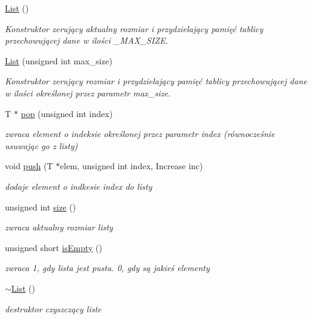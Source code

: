 \begin{DoxyCompactItemize}
\item 
\hypertarget{class_array_implementation_1_1_list_a751192da0de1a1e4095a259f24ba4bb8}{\hyperlink{class_array_implementation_1_1_list_a751192da0de1a1e4095a259f24ba4bb8}{List} ()}\label{class_array_implementation_1_1_list_a751192da0de1a1e4095a259f24ba4bb8}

\begin{DoxyCompactList}\small\item\em Konstruktor zerujący aktualny rozmiar i przydzielający pamięć tablicy przechowującej dane w ilości \-\_\-\-M\-A\-X\-\_\-\-S\-I\-Z\-E. \end{DoxyCompactList}\item 
\hyperlink{class_array_implementation_1_1_list_a8e7dfb9fc4fb0fb71d9bbf23973f5699}{List} (unsigned int max\-\_\-size)
\begin{DoxyCompactList}\small\item\em Konstruktor zerujący rozmiar i przydzielający pamięć tablicy przechowującej dane w ilości określonej przez parametr max\-\_\-size. \end{DoxyCompactList}\item 
T $\ast$ \hyperlink{class_array_implementation_1_1_list_a24975f10b03e5aad6f326b29c0cfaa63}{pop} (unsigned int index)
\begin{DoxyCompactList}\small\item\em zwraca element o indeksie określonej przez parametr index (równocześnie usuwając go z listy) \end{DoxyCompactList}\item 
void \hyperlink{class_array_implementation_1_1_list_a4a058e7e1cfeaae6c690d924302e6b24}{push} (T $\ast$elem, unsigned int index, Increase inc)
\begin{DoxyCompactList}\small\item\em dodaje element o indkesie index do listy \end{DoxyCompactList}\item 
unsigned int \hyperlink{class_array_implementation_1_1_list_ae8da3221156f614925873483913d2d38}{size} ()
\begin{DoxyCompactList}\small\item\em zwraca aktualny rozmiar listy \end{DoxyCompactList}\item 
unsigned short \hyperlink{class_array_implementation_1_1_list_a8ff22bf7b90648b3cb1d8bf9ff3fec3a}{is\-Empty} ()
\begin{DoxyCompactList}\small\item\em zwraca 1, gdy lista jest pusta. 0, gdy są jakieś elementy \end{DoxyCompactList}\item 
\hyperlink{class_array_implementation_1_1_list_abf2ba8cfb1c4b2fa9fb585460702292b}{$\sim$\-List} ()
\begin{DoxyCompactList}\small\item\em destruktor czyszczący liste \end{DoxyCompactList}\end{DoxyCompactItemize}


